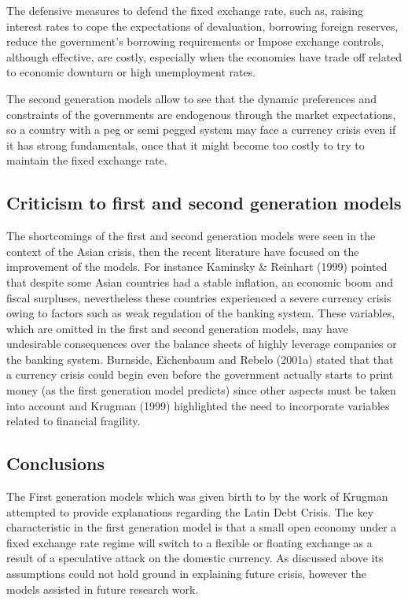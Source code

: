 \documentclass[a4paper,12pt]{article}
\begin{document}
The defensive measures to defend the fixed exchange rate, such as, raising interest rates to cope the expectations of devaluation, borrowing foreign reserves, reduce the government’s borrowing requirements or Impose exchange controls, although effective, are costly, especially when the economies have trade off related to economic downturn or high unemployment rates.

The second generation models allow to see that the dynamic preferences and constraints of the governments are endogenous through the market expectations, so a country with a peg or semi pegged system may face a currency crisis even if it has strong fundamentals, once that it might become too costly to try to maintain the fixed exchange rate. 

\subsection {Criticism to first and second generation models}
The shortcomings of the first and second generation models were seen in the context of the Asian crisis, then the recent literature have focused on the improvement of the models. For instance Kaminsky & Reinhart (1999) pointed that despite some Asian countries had a stable inflation, an economic boom and fiscal surpluses, nevertheless these countries experienced a severe currency crisis owing to factors such as weak regulation of the banking system. These variables, which are omitted in the first and second generation models, may have undesirable consequences over the balance sheets of highly leverage companies or the banking system. Burnside, Eichenbaum and Rebelo (2001a) stated that that a currency crisis could begin even before the government actually starts to print money (as the first generation model predicts) since other aspects must be taken into account and Krugman (1999) highlighted the need to incorporate variables related to financial fragility.   

\subsection{Conclusions}
The First generation models which was given birth to by the work of Krugman attempted to provide explanations regarding the Latin Debt Crisis. The key characteristic in the first generation model is that a small open economy under a fixed exchange rate regime will switch to a flexible or floating exchange as a result of a speculative attack on the domestic currency. As discussed above its assumptions could not hold ground in explaining future crisis, however the models assisted in future research work.
\end{document}
